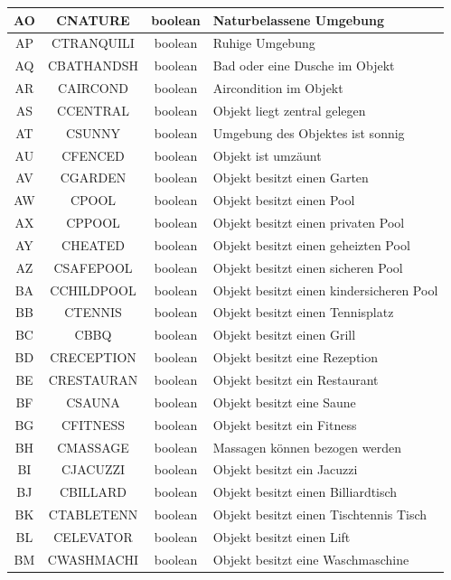 \begin{longtable}{ | c | c | c | L{7.5cm} | }
	AO & CNATURE & boolean & Naturbelassene Umgebung \\ \hline 
	AP & CTRANQUILI & boolean & Ruhige Umgebung \\ \hline 
	AQ & CBATHANDSH & boolean & Bad oder eine Dusche im Objekt \\ \hline 
	AR & CAIRCOND & boolean & Aircondition im Objekt\\ \hline 
	AS & CCENTRAL & boolean & Objekt liegt zentral gelegen \\ \hline 
	AT & CSUNNY & boolean & Umgebung des Objektes ist sonnig \\ \hline 
	AU & CFENCED & boolean & Objekt ist umzäunt \\ \hline 
	AV & CGARDEN & boolean & Objekt besitzt einen Garten \\ \hline 
	AW & CPOOL & boolean & Objekt besitzt einen Pool \\ \hline 
	AX & CPPOOL & boolean & Objekt besitzt einen privaten Pool \\ \hline 
	AY & CHEATED & boolean & Objekt besitzt einen geheizten Pool \\ \hline 
	AZ & CSAFEPOOL & boolean & Objekt besitzt einen sicheren Pool \\ \hline 
	BA & CCHILDPOOL & boolean & Objekt besitzt einen kindersicheren Pool \\ \hline 
	BB & CTENNIS & boolean & Objekt besitzt einen Tennisplatz \\ \hline 
	BC & CBBQ & boolean & Objekt besitzt einen Grill \\ \hline 
	BD & CRECEPTION & boolean & Objekt besitzt eine Rezeption \\ \hline 
	BE & CRESTAURAN & boolean & Objekt besitzt ein Restaurant \\ \hline 
	BF & CSAUNA & boolean & Objekt besitzt eine Saune \\ \hline 
	BG & CFITNESS & boolean & Objekt besitzt ein Fitness \\ \hline 
	BH & CMASSAGE & boolean & Massagen können bezogen werden \\ \hline 
	BI & CJACUZZI & boolean & Objekt besitzt ein Jacuzzi \\ \hline 
	BJ & CBILLARD & boolean & Objekt besitzt einen Billiardtisch \\ \hline 
	BK & CTABLETENN & boolean & Objekt besitzt einen Tischtennis Tisch \\ \hline 
	BL & CELEVATOR & boolean & Objekt besitzt einen Lift \\ \hline 
	BM & CWASHMACHI & boolean & Objekt besitzt eine Waschmaschine \\ \hline 

\end{longtable}
